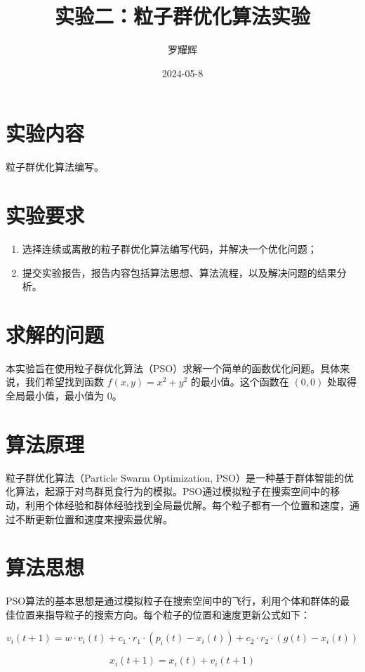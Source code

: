 \documentclass{ctexart}
\title{实验二：粒子群优化算法实验}
\author{罗耀辉}
\date{2024-05-8}
\begin{document}
\maketitle

\section{实验内容}
粒子群优化算法编写。

\section{实验要求}
\begin{enumerate}
    \item 选择连续或离散的粒子群优化算法编写代码，并解决一个优化问题；
    \item 提交实验报告，报告内容包括算法思想、算法流程，以及解决问题的结果分析。
\end{enumerate}

\section{求解的问题}
本实验旨在使用粒子群优化算法（PSO）求解一个简单的函数优化问题。具体来说，我们希望找到函数 $f(x, y) = x^2 + y^2$ 的最小值。这个函数在 $(0, 0)$ 处取得全局最小值，最小值为 $0$。

\section{算法原理}
粒子群优化算法（Particle Swarm Optimization, PSO）是一种基于群体智能的优化算法，起源于对鸟群觅食行为的模拟。PSO通过模拟粒子在搜索空间中的移动，利用个体经验和群体经验找到全局最优解。每个粒子都有一个位置和速度，通过不断更新位置和速度来搜索最优解。

\section{算法思想}
PSO算法的基本思想是通过模拟粒子在搜索空间中的飞行，利用个体和群体的最佳位置来指导粒子的搜索方向。每个粒子的位置和速度更新公式如下：

\begin{equation}
v_{i}(t+1) = w \cdot v_{i}(t) + c_{1} \cdot r_{1} \cdot (p_{i}(t) - x_{i}(t)) + c_{2} \cdot r_{2} \cdot (g(t) - x_{i}(t))
\end{equation}

\begin{equation}
x_{i}(t+1) = x_{i}(t) + v_{i}(t+1)
\end{equation}
\end{document}
